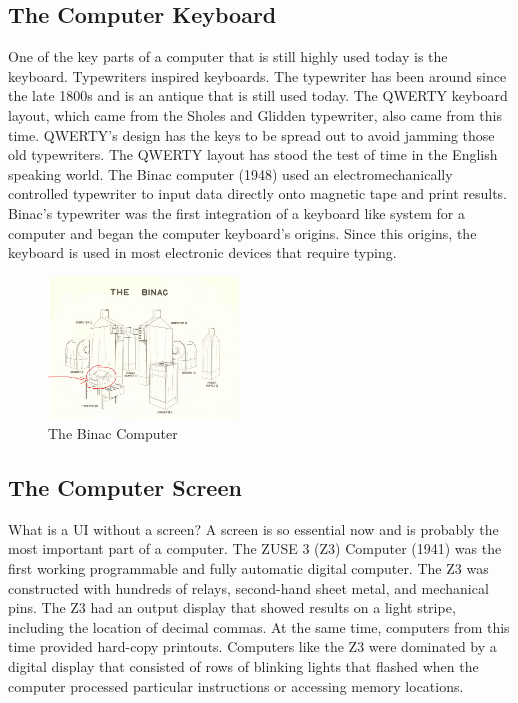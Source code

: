 \documentclass{article}
\begin{document}
\subsection{The Computer Keyboard}
One of the key parts of a computer that is still highly used today is the keyboard. Typewriters inspired keyboards. The typewriter has been around since the late 1800s and is an antique that is still used today. The QWERTY keyboard layout, which came from the Sholes and Glidden typewriter, also came from this time. QWERTY’s design has the keys to be spread out to avoid jamming those old typewriters. The QWERTY layout has stood the test of time in the English speaking world. The Binac computer (1948) used an electromechanically controlled typewriter to input data directly onto magnetic tape and print results. Binac’s typewriter was the first integration of a keyboard like system for a computer and began the computer keyboard’s origins. Since this origins, the keyboard is used in most electronic devices that require typing. 
\cite{ref3}

\begin{figure}[h!]
    \caption{The Binac Computer}
    \label{image:BINAC}
    \centering
    \includegraphics[width=0.45\textwidth]{pics/binac.jpg}
\end{figure}

\subsection{The Computer Screen}
What is a UI without a screen? A screen is so essential now and is probably the most important part of a computer. The ZUSE 3 (Z3) Computer (1941) was the first working programmable and fully automatic digital computer.  The Z3 was constructed with hundreds of relays, second-hand sheet metal, and mechanical pins. The Z3 had an output display that showed results on a light stripe, including the location of decimal commas. At the same time, computers from this time provided hard-copy printouts. Computers like the Z3 were dominated by a digital display that consisted of rows of blinking lights that flashed when the computer processed particular instructions or accessing memory locations. 
\cite{ref4} \cite{ref5}
\end{document}
